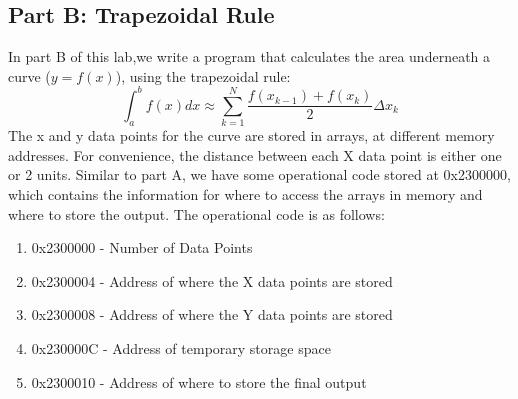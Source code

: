 \documentclass[letterpaper]{article}
\begin{document}



  \subsection{Part B: Trapezoidal Rule}

    In part B of this lab,we write a program that calculates the area
    underneath a curve ($y=f(x)$), using the trapezoidal rule:
    $$ \int_a^b f(x) dx \approx \sum_{k=1}^{N} \frac{f(x_{k-1})+f(x_k)}{2}\Delta x_k$$
    The x and y data points for the curve are stored in arrays, at different
    memory addresses. For convenience, the distance between each X data point is either one
    or 2 units. Similar to part A, we have some operational code stored at 0x2300000, which contains the
    information for where to access the arrays in memory and where to store the output.
    The operational code is as follows:

    \begin{enumerate}
      \item 0x2300000 - Number of Data Points
      \item 0x2300004 - Address of where the X data points are stored
      \item 0x2300008 - Address of where the Y data points are stored
      \item 0x230000C - Address of temporary storage space
      \item 0x2300010 - Address of where to store the final output
    \end{enumerate}
\end{document}
